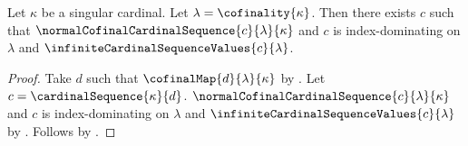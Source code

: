 \begin{theorem}\label{index_dominating_normal_cofinal_cardinal_sequence_exists}
    Let $\kappa$ be a singular cardinal.
    Let $\lambda=\cofinality{\kappa}$.
    Then there exists $c$ such that
        $\normalCofinalCardinalSequence{c}{\lambda}{\kappa}$ and
        $c$ is index-dominating on $\lambda$ and
        $\infiniteCardinalSequenceValues{c}{\lambda}$.
\end{theorem}
\begin{proof}
    Take $d$ such that $\cofinalMap{d}{\lambda}{\kappa}$
        by .
    Let $c=\cardinalSequence{\kappa}{d}$.
    $\normalCofinalCardinalSequence{c}{\lambda}{\kappa}$ and
        $c$ is index-dominating on $\lambda$ and
        $\infiniteCardinalSequenceValues{c}{\lambda}$
        by .
    Follows by \auto.
\end{proof}
